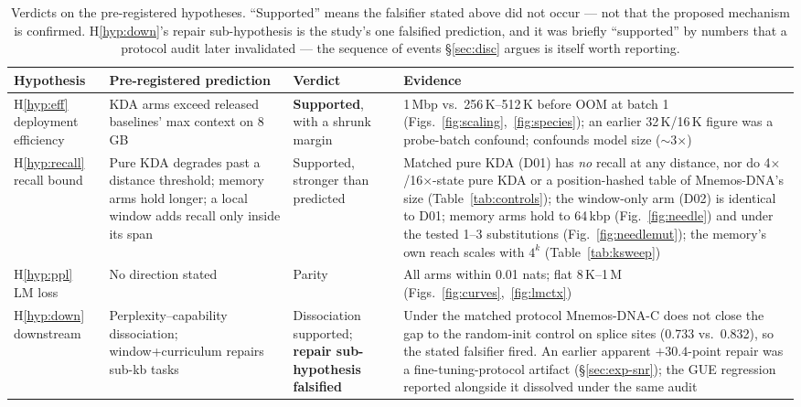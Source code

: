 \documentclass[11pt]{article}
\theoremstyle{plain}
\newcommand{\best}[1]{\textbf{#1}}
\begin{document}
\begin{table}[h]
\centering\small
\begin{tabular}{p{2.0cm}p{4.3cm}p{3.4cm}p{4.3cm}}
\toprule
Hypothesis & Pre-registered prediction & Verdict & Evidence \\
\midrule
H\ref{hyp:eff} deployment efficiency & KDA arms exceed released baselines' max context on 8\,GB &
\best{Supported}, with a shrunk margin & 1\,Mbp vs.\ 256\,K--512\,K before OOM at batch 1
(Figs.~\ref{fig:scaling},~\ref{fig:species}); an earlier 32\,K/16\,K figure was a probe-batch
confound; confounds model size ($\sim$3$\times$) \\
H\ref{hyp:recall} recall bound & Pure KDA degrades past a distance threshold; memory arms hold
longer; a local window adds recall only inside its span & Supported, stronger than predicted &
Matched pure KDA (D01) has \emph{no} recall at any distance, nor do 4$\times$/16$\times$-state
pure KDA or a position-hashed table of Mnemos-DNA's size (Table~\ref{tab:controls}); the
window-only arm (D02) is identical to D01; memory arms hold to 64\,kbp (Fig.~\ref{fig:needle}) and under the tested 1--3
substitutions (Fig.~\ref{fig:needlemut}); the memory's own reach scales with $4^k$
(Table~\ref{tab:ksweep}) \\
H\ref{hyp:ppl} LM loss & No direction stated & Parity & All arms within 0.01 nats; flat
8\,K--1\,M (Figs.~\ref{fig:curves},~\ref{fig:lmctx}) \\
H\ref{hyp:down} downstream & Perplexity--capability dissociation; window+curriculum repairs
sub-kb tasks & Dissociation supported; \textbf{repair sub-hypothesis falsified} & Under the
matched protocol Mnemos-DNA-C does not close the gap to the random-init control on splice sites
(0.733 vs.\ 0.832), so the stated falsifier fired. An earlier apparent $+30.4$-point repair was
a fine-tuning-protocol artifact (\S\ref{sec:exp-snr}); the GUE regression reported alongside it
dissolved under the same audit \\
\bottomrule
\end{tabular}
\caption{Verdicts on the pre-registered hypotheses. ``Supported'' means the falsifier stated above
did not occur --- not that the proposed mechanism is confirmed. H\ref{hyp:down}'s repair
sub-hypothesis is the study's one falsified prediction, and it was briefly ``supported'' by
numbers that a protocol audit later invalidated --- the sequence of events \S\ref{sec:disc}
argues is itself worth reporting.}
\label{tab:verdicts}
\end{table}
\end{document}
